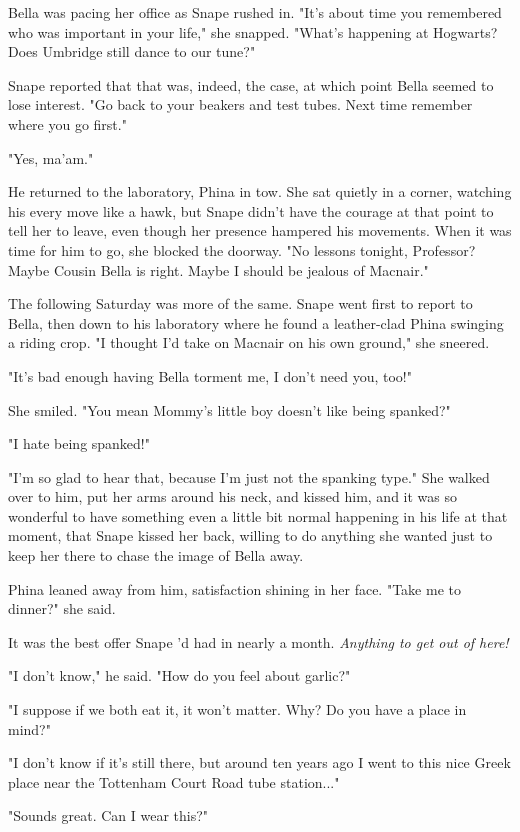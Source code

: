 Bella was pacing her office as Snape rushed in. "It's about time you remembered who was important in your life," she snapped. "What's happening at Hogwarts? Does Umbridge still dance to our tune?"

Snape reported that that was, indeed, the case, at which point Bella seemed to lose interest. "Go back to your beakers and test tubes. Next time remember where you go first."

"Yes, ma'am."

He returned to the laboratory, Phina in tow. She sat quietly in a corner, watching his every move like a hawk, but Snape didn't have the courage at that point to tell her to leave, even though her presence hampered his movements. When it was time for him to go, she blocked the doorway. "No lessons tonight, Professor? Maybe Cousin Bella is right. Maybe I should be jealous of Macnair."

The following Saturday was more of the same. Snape went first to report to Bella, then down to his laboratory where he found a leather-clad Phina swinging a riding crop. "I thought I'd take on Macnair on his own ground," she sneered.

"It's bad enough having Bella torment me, I don't need you, too!"

She smiled. "You mean Mommy's little boy doesn't like being spanked?"

"I hate being spanked!"

"I'm so glad to hear that, because I'm just not the spanking type." She walked over to him, put her arms around his neck, and kissed him, and it was so wonderful to have something even a little bit normal happening in his life at that moment, that Snape kissed her back, willing to do anything she wanted just to keep her there to chase the image of Bella away.

Phina leaned away from him, satisfaction shining in her face. "Take me to dinner?" she said.

It was the best offer Snape 'd had in nearly a month. \emph{Anything to get out of here!}

"I don't know," he said. "How do you feel about garlic?"

"I suppose if we both eat it, it won't matter. Why? Do you have a place in mind?"

"I don't know if it's still there, but around ten years ago I went to this nice Greek place near the Tottenham Court Road tube station..."

"Sounds great. Can I wear this?"

